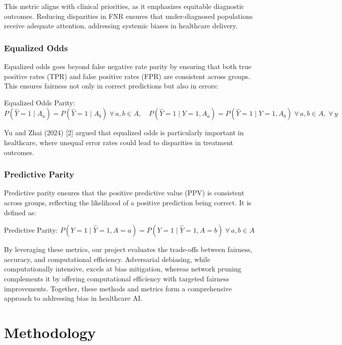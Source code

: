 \documentclass[11pt]{article}
\begin{document}
This metric aligns with clinical priorities, as it emphasizes equitable diagnostic outcomes. Reducing disparities in FNR ensures that under-diagnosed populations receive adequate attention, addressing systemic biases in healthcare delivery.

\subsubsection{Equalized Odds}

Equalized odds goes beyond false negative rate parity by ensuring that both true positive rates (TPR) and false positive rates (FPR) are consistent across groups. This ensures fairness not only in correct predictions but also in errors:

\medskip
\noindent\hfill
Equalized Odds Parity:\quad
$P(\hat{Y}=1 \mid A_a) = P(\hat{Y}=1 \mid A_b)\; \forall\, a,b \in A,\quad
P(\hat{Y}=1 \mid Y=1, A_a) = P(\hat{Y}=1 \mid Y=1, A_b)\; \forall\, a,b \in A,\; \forall\, y$
\hfill\null
\medskip

Yu and Zhai (2024) [2] argued that equalized odds is particularly important in healthcare, where unequal error rates could lead to disparities in treatment outcomes.

\subsubsection{Predictive Parity}

Predictive parity ensures that the positive predictive value (PPV) is consistent across groups, reflecting the likelihood of a positive prediction being correct. It is defined as:

\medskip
\noindent\hfill
Predictive Parity:\quad
$P(Y=1 \mid \hat{Y}=1, A=a) = P(Y=1 \mid \hat{Y}=1, A=b)\; \forall\, a,b \in A$
\hfill\null
\medskip

By leveraging these metrics, our project evaluates the trade-offs between fairness, accuracy, and computational efficiency. Adversarial debiasing, while computationally intensive, excels at bias mitigation, whereas network pruning complements it by offering computational efficiency with targeted fairness improvements. Together, these methods and metrics form a comprehensive approach to addressing bias in healthcare AI.


\section{Methodology}
\end{document}
